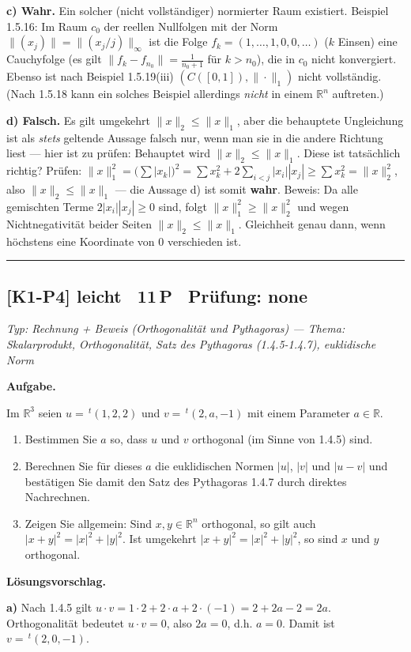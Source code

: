 \documentclass[a4paper,11pt]{article}
\begin{document}
\textbf{c) Wahr.} Ein solcher (nicht vollständiger) normierter Raum existiert. Beispiel 1.5.16: Im Raum $c_0$ der reellen Nullfolgen mit der Norm $\|(x_j)\|=\big\|(x_j/j)\big\|_\infty$ ist die Folge $f_k=(1,\dots,1,0,0,\dots)$ ($k$ Einsen) eine Cauchyfolge (es gilt $\|f_k-f_{n_0}\|=\tfrac{1}{n_0+1}$ für $k>n_0$), die in $c_0$ nicht konvergiert. Ebenso ist nach Beispiel 1.5.19(iii) $(C([0,1]),\|\cdot\|_1)$ nicht vollständig. (Nach 1.5.18 kann ein solches Beispiel allerdings \emph{nicht} in einem $\mathbb{R}^n$ auftreten.)

\textbf{d) Falsch.} Es gilt umgekehrt $\|x\|_2\le\|x\|_1$, aber die behauptete Ungleichung ist als \emph{stets} geltende Aussage falsch nur, wenn man sie in die andere Richtung liest — hier ist zu prüfen: Behauptet wird $\|x\|_2\le\|x\|_1$. Diese ist tatsächlich richtig? Prüfen: $\|x\|_1^2=\big(\sum|x_k|\big)^2=\sum x_k^2+2\sum_{i<j}|x_i||x_j|\ge \sum x_k^2=\|x\|_2^2$, also $\|x\|_2\le\|x\|_1$ — die Aussage d) ist somit \textbf{wahr}. Beweis: Da alle gemischten Terme $2|x_i||x_j|\ge0$ sind, folgt $\|x\|_1^2\ge\|x\|_2^2$ und wegen Nichtnegativität beider Seiten $\|x\|_2\le\|x\|_1$. Gleichheit genau dann, wenn höchstens eine Koordinate von $0$ verschieden ist.\par\bigskip\hrule\bigskip
\subsection*{[K1-P4] \normalfont leicht \textbullet\ 11\,P \textbullet\ Pr\"ufung: none}
\textit{Typ: Rechnung + Beweis (Orthogonalität und Pythagoras)  ---  Thema: Skalarprodukt, Orthogonalität, Satz des Pythagoras (1.4.5-1.4.7), euklidische Norm}\par\smallskip
\textbf{Aufgabe.}\par
Im $\mathbb{R}^3$ seien $u=\,^{t}(1,2,2)$ und $v=\,^{t}(2,a,-1)$ mit einem Parameter $a\in\mathbb{R}$.
\begin{enumerate}[label=\alph*)]
\item Bestimmen Sie $a$ so, dass $u$ und $v$ orthogonal (im Sinne von 1.4.5) sind.
\item Berechnen Sie für dieses $a$ die euklidischen Normen $|u|$, $|v|$ und $|u-v|$ und bestätigen Sie damit den Satz des Pythagoras 1.4.7 durch direktes Nachrechnen.
\item Zeigen Sie allgemein: Sind $x,y\in\mathbb{R}^n$ orthogonal, so gilt auch $|x+y|^2=|x|^2+|y|^2$. Ist umgekehrt $|x+y|^2=|x|^2+|y|^2$, so sind $x$ und $y$ orthogonal.
\end{enumerate}\par\smallskip
\textbf{L\"osungsvorschlag.}\par
\textbf{a)} Nach 1.4.5 gilt $u\cdot v=1\cdot2+2\cdot a+2\cdot(-1)=2+2a-2=2a$. Orthogonalität bedeutet $u\cdot v=0$, also $2a=0$, d.h. $a=0$. Damit ist $v=\,^{t}(2,0,-1)$.
\end{document}

